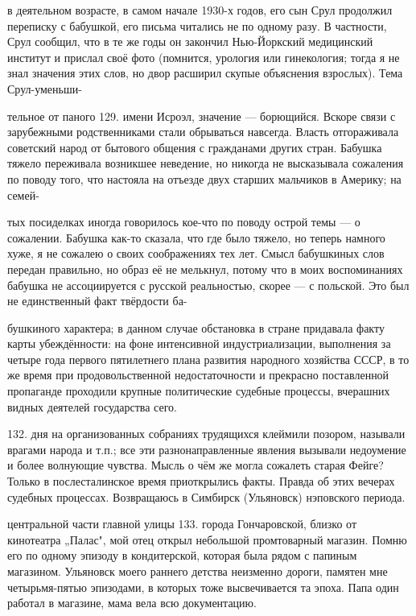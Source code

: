 в деятельном возрасте, в самом начале 1930-х годов, его сын Срул продолжил переписку с бабушкой, его письма читались не по одному разу. В частности, Срул сообщил, что в те же годы он закончил Нью-Йоркский медицинский институт и прислал своё фото (помнится, урология или гинекология; тогда я не знал значения этих слов, но двор расширил скупые объяснения взрослых). Тема Срул-уменьши-

тельное от паного 129. имени Исроэл, значение — борющийся. Вскоре связи с зарубежными родственниками стали обрываться навсегда. Власть отгораживала советский народ от бытового общения с гражданами других стран. Бабушка тяжело переживала возникшее неведение, но никогда не высказывала сожаления по поводу того, что настояла на отъезде двух старших мальчиков в Америку; на семей-

тых посиделках иногда говорилось кое-что по поводу острой темы — о сожалении. Бабушка как-то сказала, что где было тяжело, но теперь намного хуже, я не сожалею о своих соображениях тех лет. Смысл бабушкиных слов передан правильно, но образ её не мелькнул, потому что в моих воспоминаниях бабушка не ассоциируется с русской реальностью, скорее — с польской. Это был не единственный факт твёрдости ба-

бушкиного характера; в данном случае обстановка в стране придавала факту карты убеждённости: на фоне интенсивной индустриализации, выполнения за четыре года первого пятилетнего плана развития народного хозяйства СССР, в то же время при продовольственной недостаточности и прекрасно поставленной пропаганде проходили крупные политические судебные процессы, вчерашних видных деятелей государства сего.

132. дня на организованных собраниях трудящихся клеймили позором, называли врагами народа и т.п.; все эти разнонаправленные явления вызывали недоумение и более волнующие чувства. Мысль о чём же могла сожалеть старая Фейге? Только в послесталинское время приоткрылись факты. Правда об этих вечерах судебных процессах. Возвращаюсь в Симбирск (Ульяновск) нэповского периода.

центральной части главной улицы 133. города Гончаровской, близко от кинотеатра „Палас", мой отец открыл небольшой промтоварный магазин. Помню его по одному эпизоду в кондитерской, которая была рядом с папиным магазином. Ульяновск моего раннего детства неизменно дороги, памятен мне четырьмя-пятью эпизодами, в которых тоже высвечивается та эпоха. Папа один работал в магазине, мама вела всю документацию.


